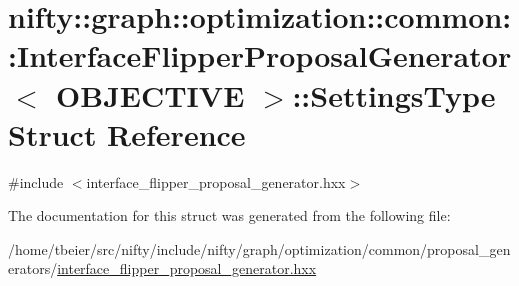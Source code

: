 \hypertarget{structnifty_1_1graph_1_1optimization_1_1common_1_1InterfaceFlipperProposalGenerator_1_1SettingsType}{}\section{nifty\+:\+:graph\+:\+:optimization\+:\+:common\+:\+:Interface\+Flipper\+Proposal\+Generator$<$ O\+B\+J\+E\+C\+T\+I\+V\+E $>$\+:\+:Settings\+Type Struct Reference}
\label{structnifty_1_1graph_1_1optimization_1_1common_1_1InterfaceFlipperProposalGenerator_1_1SettingsType}


{\ttfamily \#include $<$interface\+\_\+flipper\+\_\+proposal\+\_\+generator.\+hxx$>$}



The documentation for this struct was generated from the following file\+:\begin{DoxyCompactItemize}
\item 
/home/tbeier/src/nifty/include/nifty/graph/optimization/common/proposal\+\_\+generators/\hyperlink{interface__flipper__proposal__generator_8hxx}{interface\+\_\+flipper\+\_\+proposal\+\_\+generator.\+hxx}\end{DoxyCompactItemize}
